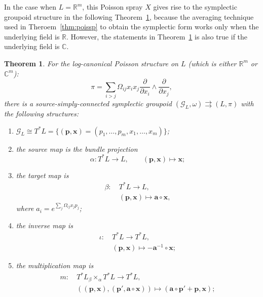 \documentclass{amsart}
\newtheorem{theorem}{Theorem}[section]
\newcommand{\bfa}{\mathbf{a}}
\newcommand{\bfp}{\mathbf{p}}
\newcommand{\bfx}{\mathbf{x}}
\newcommand{\cG}{\mathcal{G}}
\newcommand{\CC}{\mathbb{C}}
\newcommand{\RR}{\mathbb{R}}
\newcommand{\rra}{\rightrightarrows}
\begin{document}
In the case when $L = \RR^m$, this Poisson spray $X$ gives rise to the symplectic groupoid structure in the following Theorem~\ref{thm:PoiSpLogC}, because the averaging technique used in Theroem~\ref{thm:poissp} to obtain the symplectic form works only when the underlying field is $\RR$. However, the statements in Theorem~\ref{thm:PoiSpLogC} is also true if the underlying field is $\CC$.

\begin{theorem} \label{thm:PoiSpLogC}
For the log-canonical Poisson structure on $L$ (which is either $\RR^m$ or $\CC^m$):
$$
	\pi = \sum_{i > j} \Omega_{ij} x_i x_j\frac{\partial}{\partial x_i} \wedge \frac{\partial}{\partial x_j},
$$
there is a source-simply-connected symplectic groupoid $(\cG_L, \omega) \rra (L, \pi)$ with the following structures:
	\begin{enumerate}
		\item $\cG_L \cong T^*L = \{(\bfp, \bfx) = (p_1, \ldots, p_m, x_1, \ldots, x_m)\}$;
		\item the source map is the bundle projection
			$$
				\alpha: T^*L \to L, \qquad (\bfp, \bfx) \mapsto \bfx;
			$$
		\item the target map is
			$$
				\begin{aligned}
				\beta:~ & T^*L \to L, \\
				& (\bfp, \bfx) \mapsto \bfa \circ \bfx,
				\end{aligned}
			$$
			where $a_i = e^{\sum\limits_{j} \Omega_{ij} x_jp_j}$;
		\item the inverse map is
			$$
				\begin{aligned}
				\iota:~ & T^*L \to T^*L, \\
				& (\bfp, \bfx) \mapsto -\bfa^{-1}\circ \bfx;
				\end{aligned}
			$$ 
		\item the multiplication map is
			$$
				\begin{aligned}
				m:~ & T^*L {_\beta \times_\alpha} T^*L \to T^*L, \\
				& ((\bfp, \bfx), (\bfp', \bfa \circ \bfx)) \mapsto (\bfa \circ \bfp' + \bfp, \bfx );

\end{aligned}$$
\end{enumerate}
\end{theorem}
\end{document}
